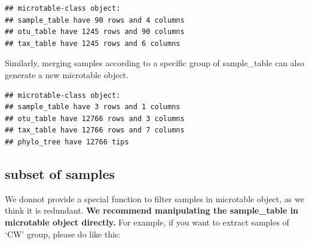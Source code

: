 \documentclass[
]{book}
\newenvironment{Shaded}{\begin{snugshade}}{\end{snugshade}}
\newcommand{\AttributeTok}[1]{\textcolor[rgb]{0.77,0.63,0.00}{#1}}
\newcommand{\CommentTok}[1]{\textcolor[rgb]{0.56,0.35,0.01}{\textit{#1}}}
\newcommand{\FunctionTok}[1]{\textcolor[rgb]{0.00,0.00,0.00}{#1}}
\newcommand{\NormalTok}[1]{#1}
\newcommand{\OtherTok}[1]{\textcolor[rgb]{0.56,0.35,0.01}{#1}}
\newcommand{\SpecialCharTok}[1]{\textcolor[rgb]{0.00,0.00,0.00}{#1}}
\newcommand{\StringTok}[1]{\textcolor[rgb]{0.31,0.60,0.02}{#1}}
\begin{document}
\begin{verbatim}
## microtable-class object:
## sample_table have 90 rows and 4 columns
## otu_table have 1245 rows and 90 columns
## tax_table have 1245 rows and 6 columns
\end{verbatim}

Similarly, merging samples according to a specific group of sample\_table can also generate a new microtable object.

\begin{Shaded}
\end{Shaded}

\begin{verbatim}
## microtable-class object:
## sample_table have 3 rows and 1 columns
## otu_table have 12766 rows and 3 columns
## tax_table have 12766 rows and 7 columns
## phylo_tree have 12766 tips
\end{verbatim}

\hypertarget{subset-of-samples}{%
\subsection{subset of samples}\label{subset-of-samples}}

We donnot provide a special function to filter samples in microtable object, as we think it is redundant.
\textbf{We recommend manipulating the sample\_table in microtable object directly.}
For example, if you want to extract samples of `CW' group, please do like this:

\begin{Shaded}
\end{Shaded}
\end{document}
